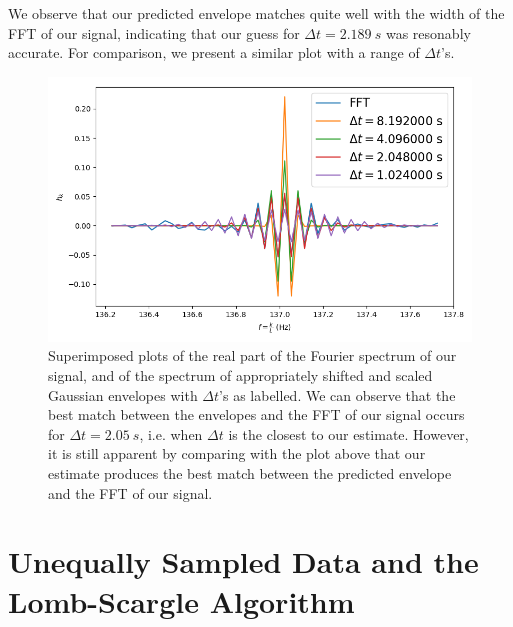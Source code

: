 \documentclass[11pt]{article}
\begin{document}
\begin{enumerate}
	We observe that our predicted envelope matches quite well with the width of the FFT of our signal, indicating that our guess for $\Delta t = 2.189 \ s$ was resonably accurate. For comparison, we present a similar plot with a range of $\Delta t$'s.
	\begin{figure}[htp]
\centering
\includegraphics[scale=0.70]{dt_compare_others.png}
\caption{Superimposed plots of the real part of the Fourier spectrum of our signal, and of the spectrum of appropriately shifted and scaled Gaussian envelopes with $\Delta t$'s as labelled. We can observe that the best match between the envelopes and the FFT of our signal occurs for $\Delta t = 2.05 \ s$, i.e. when $\Delta t$ is the closest to our estimate. However, it is still apparent by comparing with the plot above that our estimate produces the best match between the predicted envelope and the FFT of our signal.}
\label{comp_2}
\end{figure}
\end{enumerate}
\newpage

\section{Unequally Sampled Data and the Lomb-Scargle Algorithm}
\end{document}
